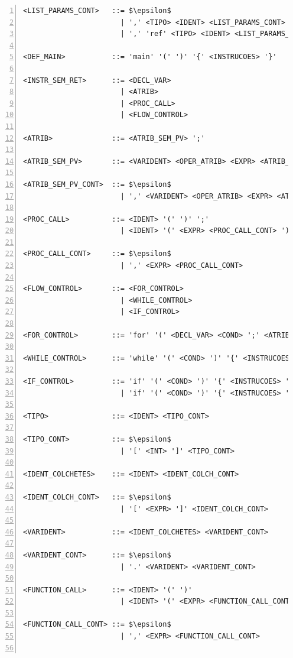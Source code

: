 \begin{lstlisting}[frame=single,numbers=left,breaklines=true,mathescape=true>,basicstyle=\ttfamily\scriptsize]
<LIST_PARAMS_CONT>   ::= $\epsilon$
                       | ',' <TIPO> <IDENT> <LIST_PARAMS_CONT>
                       | ',' 'ref' <TIPO> <IDENT> <LIST_PARAMS_CONT>

<DEF_MAIN>           ::= 'main' '(' ')' '{' <INSTRUCOES> '}'

<INSTR_SEM_RET>      ::= <DECL_VAR>
                       | <ATRIB>
                       | <PROC_CALL>
                       | <FLOW_CONTROL>

<ATRIB>              ::= <ATRIB_SEM_PV> ';'

<ATRIB_SEM_PV>       ::= <VARIDENT> <OPER_ATRIB> <EXPR> <ATRIB_SEM_PV_CONT>

<ATRIB_SEM_PV_CONT>  ::= $\epsilon$
                       | ',' <VARIDENT> <OPER_ATRIB> <EXPR> <ATRIB_SEM_PV_CONT>

<PROC_CALL>          ::= <IDENT> '(' ')' ';'
                       | <IDENT> '(' <EXPR> <PROC_CALL_CONT> ')' ';'

<PROC_CALL_CONT>     ::= $\epsilon$
                       | ',' <EXPR> <PROC_CALL_CONT>

<FLOW_CONTROL>       ::= <FOR_CONTROL>
                       | <WHILE_CONTROL>
                       | <IF_CONTROL>

<FOR_CONTROL>        ::= 'for' '(' <DECL_VAR> <COND> ';' <ATRIB_SEM_PV> ')' '{' <INSTRUCOES> '}'

<WHILE_CONTROL>      ::= 'while' '(' <COND> ')' '{' <INSTRUCOES> '}'

<IF_CONTROL>         ::= 'if' '(' <COND> ')' '{' <INSTRUCOES> '}'
                       | 'if' '(' <COND> ')' '{' <INSTRUCOES> '}' 'else' '{' <INSTRUCOES> '}'

<TIPO>               ::= <IDENT> <TIPO_CONT>

<TIPO_CONT>          ::= $\epsilon$
                       | '[' <INT> ']' <TIPO_CONT>

<IDENT_COLCHETES>    ::= <IDENT> <IDENT_COLCH_CONT>

<IDENT_COLCH_CONT>   ::= $\epsilon$
                       | '[' <EXPR> ']' <IDENT_COLCH_CONT>

<VARIDENT>           ::= <IDENT_COLCHETES> <VARIDENT_CONT>

<VARIDENT_CONT>      ::= $\epsilon$
                       | '.' <VARIDENT> <VARIDENT_CONT>

<FUNCTION_CALL>      ::= <IDENT> '(' ')'
                       | <IDENT> '(' <EXPR> <FUNCTION_CALL_CONT> ')'

<FUNCTION_CALL_CONT> ::= $\epsilon$
                       | ',' <EXPR> <FUNCTION_CALL_CONT>


\end{lstlisting}
